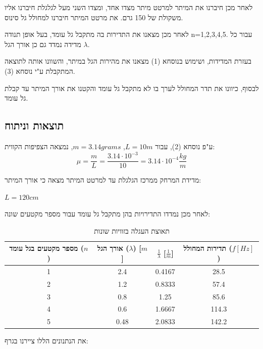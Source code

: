 \documentclass[14pt]{extarticle}
\begin{document}
לאחר מכן חיברנו את המיתר למרטט מיתר  מצדו אחד, ומצדו השני  מעל לגלגלת חיברנו אליו משקולת של 150 גרם.
את  מרטט המיתר  חיברנו למחולל גל  סינוס.

לאחר מכן מצאנו את התדירות  בה מתקבל גל עומד, בעל אופן תנודה n=1,2,3,4,5. עבור כל מדידה נמדד גם כן  אורך הגל $\lambda$.

בעזרת המדידות, ושימוש בנוסחא (1) מצאנו את מהירות הגל במיתר, והשוונו אותה לתוצאה המתקבלת ע"י נוסחא (3).

לבסוף, כיוונו  את  תדר המחולל לערך בו לא מתקבל גל  עומד והקטנו את אורך  המיתר עד קבלת גל עומד.

\subsection*{תוצאות וניתוח}
ע"פ נוסחא (2), עבור $L=10m$, $m=3.14 grams$, נמצאה הצפיפות הקווית:
\begin{equation*}
    \mu = \frac{m}{L} = \frac{3.14 \cdot 10^{-3}}{10} = 3.14 \cdot 10^{-4} \frac{kg}{m}
\end{equation*}

מדידת המרחק ממרכז הגלגלת עד למרטט המיתר מצאה כי אורך המיתר:

$L=120cm$

לאחר מכן נמדדו התדירויות בהן מתקבל גל עומד עבור מספר מקטעים שונה:

\begin{table}[H]
    \centering
    \renewcommand{\arraystretch}{1.5} %
    \begin{tabular}{|c|c|c|c|}
        \hline
        מספר מקטעים בגל עומד ($n$) & אורך הגל ($\lambda$) [$m$] & $\frac{1}{\lambda}$ [$\frac{1}{m}$] & תדירות המחולל ($f [Hz]$) \\
        \hline
        1                          & 2.4                        & 0.4167                              & 28.5                     \\
        2                          & 1.2                        & 0.8333                              & 57.4                     \\
        3                          & 0.8                        & 1.25                                & 85.6                     \\
        4                          & 0.6                        & 1.6667                              & 114.3                    \\
        5                          & 0.48                       & 2.0833                              & 142.2                    \\
        \hline
    \end{tabular}
    \caption{תאוצת העגלה בזוויות שונות}
\end{table}
את הנתנונים הללו ציירנו בגרף:
\end{document}
